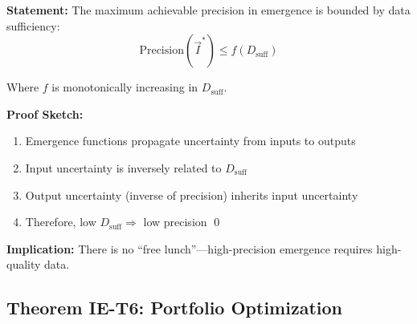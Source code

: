 \begin{tcolorbox}[colback=green!5!white, colframe=green!75!black,
    title=\textbf{Theorem IE-T5: Data Sufficiency Determines Mode Feasibility}]

\textbf{Statement:} The maximum achievable precision in emergence is bounded by data sufficiency:
\begin{equation}
\text{Precision}(\vec{I}^*) \leq f(D_{\text{suff}})
\end{equation}

Where $f$ is monotonically increasing in $D_{\text{suff}}$.

\textbf{Proof Sketch:}
\begin{enumerate}[nosep]
    \item Emergence functions propagate uncertainty from inputs to outputs
    \item Input uncertainty is inversely related to $D_{\text{suff}}$
    \item Output uncertainty (inverse of precision) inherits input uncertainty
    \item Therefore, low $D_{\text{suff}} \Rightarrow$ low precision \qed
\end{enumerate}

\textbf{Implication:} There is no ``free lunch''---high-precision emergence requires high-quality data.

\end{tcolorbox}

\subsection{Theorem IE-T6: Portfolio Optimization}

